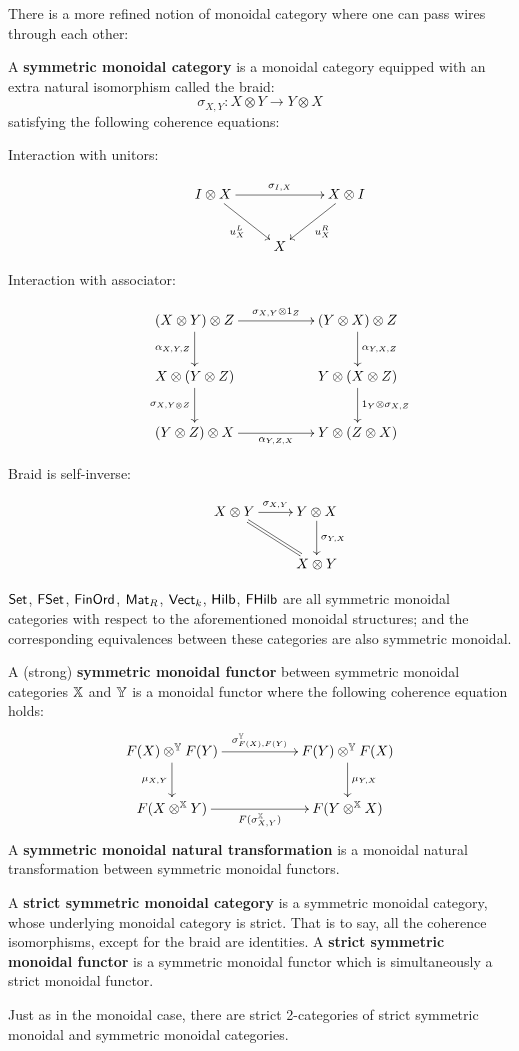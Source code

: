 There is a more refined notion of monoidal category where one can pass wires through each other:
\begin{definition}
A {\bf symmetric monoidal category} is a monoidal category equipped with an extra natural isomorphism called the braid:
$$
\sigma_{X,Y}:X\otimes Y \to Y\otimes X
$$
satisfying the following coherence equations:
\begin{description}
\item[Interaction with unitors:]
$$
\xymatrix{
I \otimes X \ar[rr]^{\sigma_{I,X}} \ar[rd]_{u^L_X} && X \otimes I \ar[ld]^{u^R_X} \\
& X &
}
$$
\item[Interaction with associator:]
$$
\xymatrix{
  (X\otimes Y)\otimes Z \ar[rr]^{\sigma_{X,Y}\otimes 1_Z} \ar[d]_{\alpha_{X,Y,Z}}
    &
    &  (Y\otimes X)\otimes Z \ar[d]^{\alpha_{Y,X,Z}}
  \\X\otimes(Y\otimes Z) \ar[d]_{\sigma_{X,Y\otimes Z}}
    &
    &  Y\otimes(X\otimes Z) \ar[d]^{1_Y\otimes \sigma_{X,Z}}
  \\ (Y\otimes Z)\otimes X \ar[rr]_{\alpha_{Y,Z,X}}
    &
    & Y\otimes (Z\otimes X)
}
$$
\item[Braid is self-inverse:]
$$
\xymatrix{
   X\otimes Y \ar[r]^{\sigma_{X,Y}} \ar@{=}[dr]
   &  Y\otimes X \ar[d]^{\sigma_{Y,X}}\\
   & X \otimes Y
}
$$
\end{description}
\end{definition}
\begin{example}
$\mathsf{Set}$, $\mathsf{FSet}$, $\mathsf{FinOrd}$, $\mathsf{Mat}_R$, $\mathsf{Vect}_k$, $\mathsf{Hilb}$, $\mathsf{FHilb}$ are all symmetric monoidal categories with respect to the aforementioned monoidal structures; and the corresponding equivalences between these categories are also symmetric monoidal.
\end{example}
\begin{definition}
A (strong) {\bf symmetric monoidal functor} between symmetric monoidal categories $\mathbb{X}$ and $\mathbb{Y}$ is a monoidal functor where the following coherence equation holds:
$$
\xymatrix{
  F(X)\otimes^\Y F(Y) \ar[rr]^{\sigma_{F(X),F(Y)}^\Y} \ar[d]_{\mu_{X,Y}}
   && F(Y) \otimes^\Y F(X) \ar[d]^{\mu_{Y,X}}
\\F(X\otimes^\X Y) \ar[rr]_{F(\sigma_{X,Y}^\X)}
 && F(Y \otimes^\X X)
}
$$
A {\bf symmetric monoidal natural transformation} is a monoidal natural transformation between symmetric monoidal functors.  




A {\bf strict symmetric monoidal category} is a symmetric monoidal category, whose underlying monoidal category is strict. That is to say, all the coherence isomorphisms, except for the braid are identities.
A {\bf strict symmetric monoidal functor} is a symmetric monoidal functor which is simultaneously a strict monoidal functor.


Just as in the monoidal case, there are strict 2-categories of strict symmetric monoidal and symmetric monoidal categories.
\end{definition}
